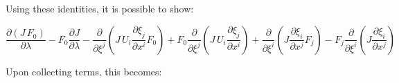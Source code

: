 Using these identities, it is possible to show:

\[\frac{{\partial \left( {J\,{F_0}} \right)}}{{\partial \lambda }} - {F_0}\frac{{\partial J}}{{\partial \lambda }} - \frac{\partial }{{\partial {\xi ^j}}}\left( {J\,{U_i}\frac{{\partial {\xi _j}}}{{\partial {x^i}}}{F_0}} \right) + {F_0}\frac{\partial }{{\partial {\xi ^j}}}\left( {J\,{U_i}\frac{{\partial {\xi _j}}}{{\partial {x^i}}}} \right) + \frac{\partial }{{\partial {\xi ^i}}}\left( {J\frac{{\partial {\xi _i}}}{{\partial {x^j}}}{F_j}} \right) - {F_j}\frac{\partial }{{\partial {\xi ^i}}}\left( {J\frac{{\partial {\xi _i}}}{{\partial {x^j}}}} \right)\]

Upon collecting terms, this becomes:

